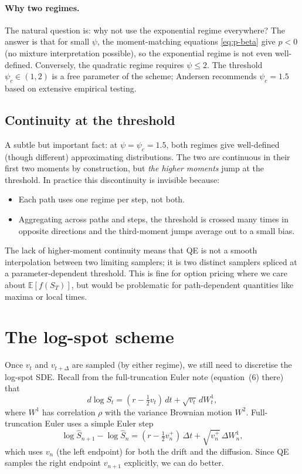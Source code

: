 \documentclass[11pt]{article}
\theoremstyle{plain}
\theoremstyle{definition}
\theoremstyle{remark}
\begin{document}
\paragraph{Why two regimes.} The natural question is: why not use the exponential regime everywhere? The answer is that for small $\psi$, the moment-matching equations \eqref{eq:p-beta} give $p < 0$ (no mixture interpretation possible), so the exponential regime is not even well-defined. Conversely, the quadratic regime requires $\psi \leq 2$. The threshold $\psi_c \in (1, 2)$ is a free parameter of the scheme; Andersen recommends $\psi_c = 1.5$ based on extensive empirical testing.

\subsection{Continuity at the threshold}

A subtle but important fact: at $\psi = \psi_c = 1.5$, both regimes give well-defined (though different) approximating distributions. The two are continuous in their first two moments by construction, but \emph{the higher moments} jump at the threshold. In practice this discontinuity is invisible because:
\begin{itemize}[topsep=2pt]
    \item Each path uses one regime per step, not both.
    \item Aggregating across paths and steps, the threshold is crossed many times in opposite directions and the third-moment jumps average out to a small bias.
\end{itemize}
The lack of higher-moment continuity means that QE is not a smooth interpolation between two limiting samplers; it is two distinct samplers spliced at a parameter-dependent threshold. This is fine for option pricing where we care about $\mathbb{E}[f(S_T)]$, but would be problematic for path-dependent quantities like maxima or local times.

\section{The log-spot scheme}

Once $v_t$ and $v_{t+\Delta}$ are sampled (by either regime), we still need to discretise the log-spot SDE. Recall from the full-truncation Euler note (equation~(6) there) that
\[
    d \log S_t = (r - \tfrac12 v_t)\, dt + \sqrt{v_t}\, dW^1_t,
\]
where $W^1$ has correlation $\rho$ with the variance Brownian motion $W^2$. Full-truncation Euler uses a simple Euler step
\[
    \log \hat S_{n+1} - \log \hat S_n = (r - \tfrac12 v_n^+)\, \Delta t + \sqrt{v_n^+}\,\Delta W^1_n,
\]
which uses $v_n$ (the left endpoint) for both the drift and the diffusion. Since QE samples the right endpoint $v_{n+1}$ explicitly, we can do better.
\end{document}

